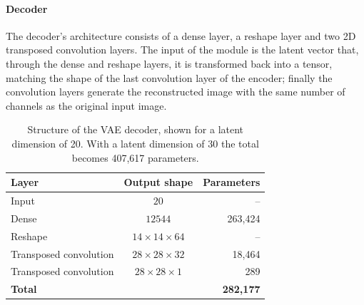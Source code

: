 \paragraph{Decoder}
\hfill \break
The decoder’s architecture consists of a dense layer, a reshape layer and two 2D transposed convolution layers. The input of the module is the latent vector that, through the dense and reshape layers, it is transformed back into a tensor, matching the shape of the last convolution layer of the encoder; finally the convolution layers generate the reconstructed image with the same number of channels as the original input image.
\begin{table}[H]
    \centering
    \begin{tabular}{l c r}
    \textbf{Layer} & \textbf{Output shape} & \textbf{Parameters} \\
    \hline
    Input & \( 20 \) & -- \\
    Dense & \( 12544 \) & 263{,}424 \\
    Reshape & \( 14 \times 14 \times 64 \) & -- \\
    Transposed convolution & \( 28 \times 28 \times 32 \) & 18{,}464 \\
    Transposed convolution & \( 28 \times 28 \times 1 \) & 289 \\
    \hline
    \textbf{Total} & & \textbf{282{,}177} \\
    \end{tabular}
    \caption{Structure of the VAE decoder, shown for a latent dimension of 20. With a latent dimension of 30 the total becomes 407{,}617 parameters.}
    \label{tab:vae decoder}
\end{table}
